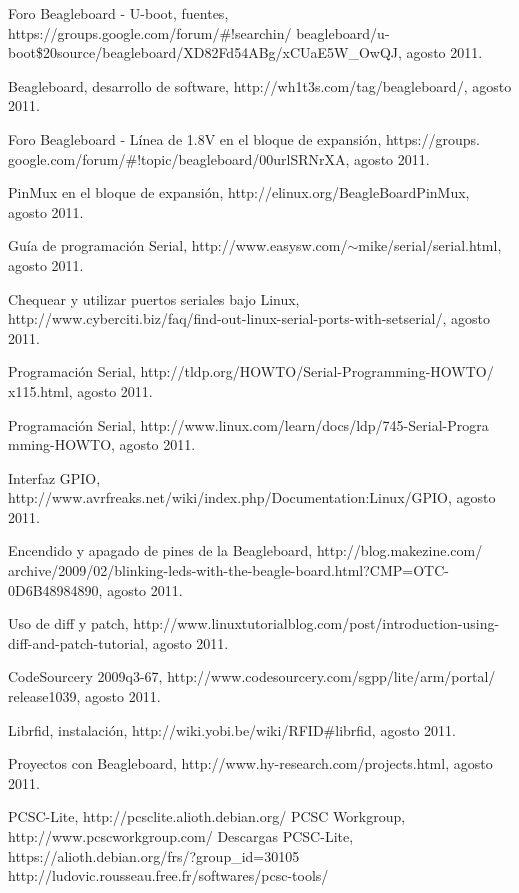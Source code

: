 \begin{thebibliography}{200}
\bibitem{} Foro Beagleboard - U-boot, fuentes, https://groups.google.com/forum/\#!searchin/
beagleboard/u-boot\$20source/beagleboard/XD82Fd54ABg/xCUaE5W\_OwQJ, agosto 2011.

\bibitem{} Beagleboard, desarrollo de software, http://wh1t3s.com/tag/beagleboard/, agosto 2011.

\bibitem{} Foro Beagleboard - Línea de 1.8V en el bloque de expansión, https://groups.\\
google.com/forum/\#!topic/beagleboard/00urlSRNrXA, agosto 2011.

\bibitem{} PinMux en el bloque de expansión, http://elinux.org/BeagleBoardPinMux, agosto 2011.

\bibitem{} Guía de programación Serial, http://www.easysw.com/$\sim$mike/serial/serial.html, agosto 2011.

\bibitem{} Chequear y utilizar puertos seriales bajo Linux, http://www.cyberciti.biz/faq/find-out-linux-serial-ports-with-setserial/, agosto 2011.

\bibitem{} Programación Serial, http://tldp.org/HOWTO/Serial-Programming-HOWTO/\\
x115.html, agosto 2011.

\bibitem{} Programación Serial, http://www.linux.com/learn/docs/ldp/745-Serial-Progra\\
mming-HOWTO, agosto 2011.

\bibitem{} Interfaz GPIO, http://www.avrfreaks.net/wiki/index.php/Documentation:Linux/GPIO, agosto 2011.

\bibitem{} Encendido y apagado de pines de la Beagleboard, http://blog.makezine.com/\\
archive/2009/02/blinking-leds-with-the-beagle-board.html?CMP=OTC-0D6B48984890, agosto 2011.

\bibitem{} Uso de diff y patch, http://www.linuxtutorialblog.com/post/introduction-using-diff-and-patch-tutorial, agosto 2011.

\bibitem{} CodeSourcery 2009q3-67, http://www.codesourcery.com/sgpp/lite/arm/portal/\\
release1039, agosto 2011.

\bibitem{} Librfid, instalación, http://wiki.yobi.be/wiki/RFID\#librfid, agosto 2011.

\bibitem{} Proyectos con Beagleboard, http://www.hy-research.com/projects.html, agosto 2011.


 PCSC-Lite, http://pcsclite.alioth.debian.org/
 PCSC Workgroup, http://www.pcscworkgroup.com/
 Descargas PCSC-Lite, https://alioth.debian.org/frs/?group\_id=30105
 http://ludovic.rousseau.free.fr/softwares/pcsc-tools/


\end{thebibliography}
